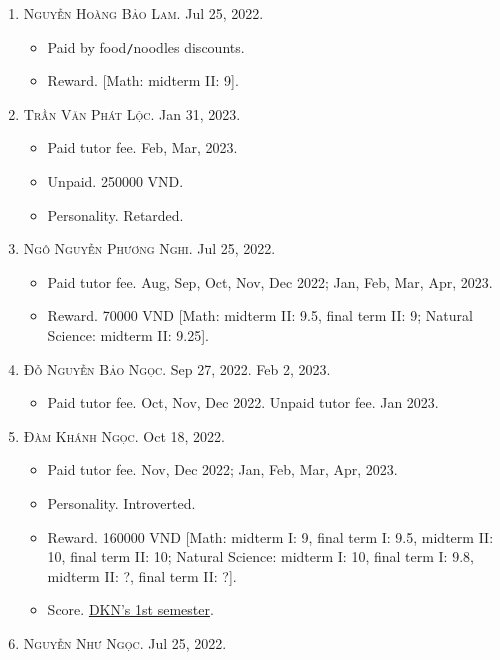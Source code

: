 \documentclass{article}
\begin{document}
\begin{enumerate}
\begin{itemize}
	\end{itemize}
	\item \textsc{Nguyễn Hoàng Bảo Lam.} {\sf[In]} Jul 25, 2022.
	\begin{itemize}
		\item {\sf Paid by food\texttt{/}noodles discounts.}
		\item {\sf Reward.} [Math: midterm II: 9].
	\end{itemize}
	\item \textsc{Trần Văn Phát Lộc.} {\sf[In]} Jan 31, 2023.  {\sf[Out]}
	\begin{itemize}
		\item {\sf Paid tutor fee.} Feb, Mar, 2023.
		\item {\sf Unpaid.} 250000 VND.
		\item {\sf Personality.} Retarded.
	\end{itemize}
	\item \textsc{Ngô Nguyễn Phương Nghi.} {\sf[In]} Jul 25, 2022.
	\begin{itemize}
		\item {\sf Paid tutor fee.} Aug, Sep, Oct, Nov, Dec 2022; Jan, Feb, Mar, Apr, 2023.
		\item {\sf Reward.} 70000 VND [Math: midterm II: 9.5, final term II: 9; Natural Science: midterm II: 9.25].
	\end{itemize}
	\item \textsc{Đỗ Nguyễn Bảo Ngọc.} {\sf[In]} Sep 27, 2022. {\sf[Out]} Feb 2, 2023.
	\begin{itemize}
		\item {\sf Paid tutor fee.} Oct, Nov, Dec 2022. {\sf Unpaid tutor fee.} Jan 2023.
	\end{itemize}
	\item \textsc{Đàm Khánh Ngọc.} {\sf[In]} Oct 18, 2022.
	\begin{itemize}
		\item {\sf Paid tutor fee.} Nov, Dec 2022; Jan, Feb, Mar, Apr, 2023.
		\item {\sf Personality.} Introverted.
		\item {\sf Reward.} 160000 VND [Math: midterm I: 9, final term I: 9.5, midterm II: 10, final term II: 10; Natural Science: midterm I: 10, final term I: 9.8, midterm II: ?, final term II: ?].
		\item {\sf Score.} \href{https://github.com/NQBH/hobby/blob/master/STEM/student/Dam_Khanh_Ngoc_grade_6_1st_semester.jpg}{DKN's 1st semester}.
	\end{itemize}
	\item \textsc{Nguyễn Như Ngọc.} {\sf[In]} Jul 25, 2022.

\end{enumerate}
\end{document}
